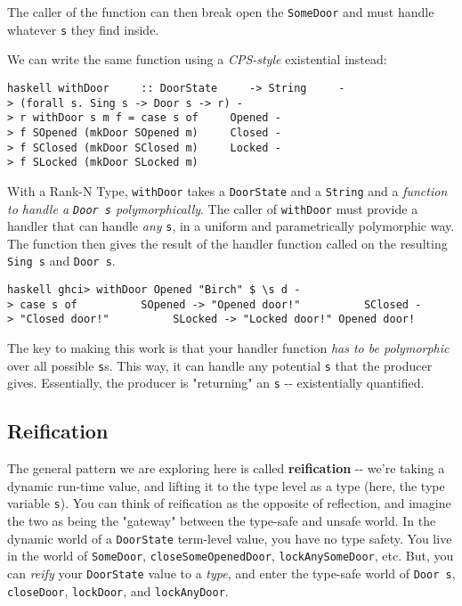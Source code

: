 \documentclass[]{article}
\begin{document}
The caller of the function can then break open the \texttt{SomeDoor} and must
handle whatever \texttt{s} they find inside.

We can write the same function using a \emph{CPS-style} existential instead:

\texttt{haskell\ withDoor\ \ \ \ \ ::\ DoorState\ \ \ \ \ -\textgreater{}\ String\ \ \ \ \ -\textgreater{}\ (forall\ s.\ Sing\ s\ -\textgreater{}\ Door\ s\ -\textgreater{}\ r)\ -\textgreater{}\ r\ withDoor\ s\ m\ f\ =\ case\ s\ of\ \ \ \ \ Opened\ -\textgreater{}\ f\ SOpened\ (mkDoor\ SOpened\ m)\ \ \ \ \ Closed\ -\textgreater{}\ f\ SClosed\ (mkDoor\ SClosed\ m)\ \ \ \ \ Locked\ -\textgreater{}\ f\ SLocked\ (mkDoor\ SLocked\ m)}

With a Rank-N Type, \texttt{withDoor} takes a \texttt{DoorState} and a
\texttt{String} and a \emph{function to handle a \texttt{Door\ s}
polymorphically}. The caller of \texttt{withDoor} must provide a handler that
can handle \emph{any} \texttt{s}, in a uniform and parametrically polymorphic
way. The function then gives the result of the handler function called on the
resulting \texttt{Sing\ s} and \texttt{Door\ s}.

\texttt{haskell\ ghci\textgreater{}\ withDoor\ Opened\ "Birch"\ \$\ \textbackslash{}s\ d\ -\textgreater{}\ case\ s\ of\ \ \ \ \ \ \ \ \ \ SOpened\ -\textgreater{}\ "Opened\ door!"\ \ \ \ \ \ \ \ \ \ SClosed\ -\textgreater{}\ "Closed\ door!"\ \ \ \ \ \ \ \ \ \ SLocked\ -\textgreater{}\ "Locked\ door!"\ Opened\ door!}

The key to making this work is that your handler function \emph{has to be
polymorphic} over all possible \texttt{s}s. This way, it can handle any
potential \texttt{s} that the producer gives. Essentially, the producer is
"returning" an \texttt{s} -\/- existentially quantified.

\subsection{Reification}

The general pattern we are exploring here is called \textbf{reification} -\/-
we're taking a dynamic run-time value, and lifting it to the type level as a
type (here, the type variable \texttt{s}). You can think of reification as the
opposite of reflection, and imagine the two as being the "gateway" between the
type-safe and unsafe world. In the dynamic world of a \texttt{DoorState}
term-level value, you have no type safety. You live in the world of
\texttt{SomeDoor}, \texttt{closeSomeOpenedDoor}, \texttt{lockAnySomeDoor}, etc.
But, you can \emph{reify} your \texttt{DoorState} value to a \emph{type}, and
enter the type-safe world of \texttt{Door\ s}, \texttt{closeDoor},
\texttt{lockDoor}, and \texttt{lockAnyDoor}.
\end{document}
